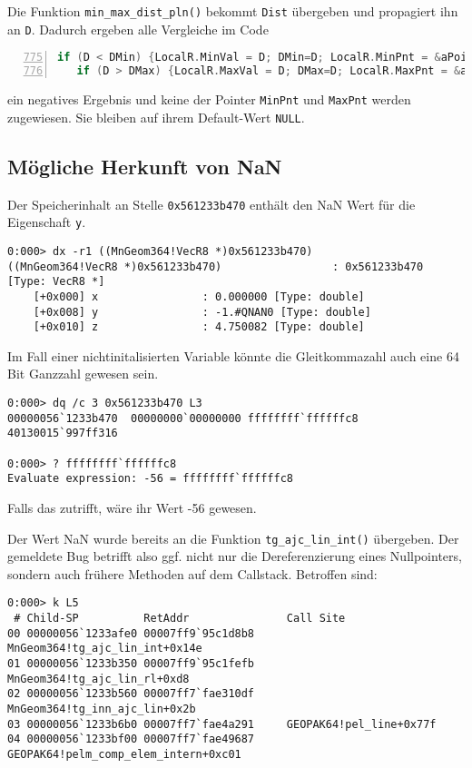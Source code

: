 Die Funktion \verb|min_max_dist_pln()| bekommt \verb|Dist| übergeben und propagiert ihn an \verb|D|. Dadurch ergeben alle Vergleiche im Code

\begin{lstlisting}[language=C, numbers=left, firstnumber=775]
   if (D < DMin) {LocalR.MinVal = D; DMin=D; LocalR.MinPnt = &aPoints[i];}
   if (D > DMax) {LocalR.MaxVal = D; DMax=D; LocalR.MaxPnt = &aPoints[i];} 
\end{lstlisting}

ein negatives Ergebnis und keine der Pointer \verb|MinPnt| und \verb|MaxPnt| werden zugewiesen. Sie bleiben auf ihrem Default-Wert \verb|NULL|.

\subsection{Mögliche Herkunft von NaN}

Der Speicherinhalt an Stelle \verb|0x561233b470| enthält den NaN Wert für die Eigenschaft \verb|y|.

\begin{lstlisting}
0:000> dx -r1 ((MnGeom364!VecR8 *)0x561233b470)
((MnGeom364!VecR8 *)0x561233b470)                 : 0x561233b470 [Type: VecR8 *]
    [+0x000] x                : 0.000000 [Type: double]
    [+0x008] y                : -1.#QNAN0 [Type: double]
    [+0x010] z                : 4.750082 [Type: double]
\end{lstlisting}

Im Fall einer nichtinitalisierten Variable könnte die Gleitkommazahl auch eine 64 Bit Ganzzahl gewesen sein. 

\begin{lstlisting}
0:000> dq /c 3 0x561233b470 L3
00000056`1233b470  00000000`00000000 ffffffff`ffffffc8 40130015`997ff316

0:000> ? ffffffff`ffffffc8
Evaluate expression: -56 = ffffffff`ffffffc8
\end{lstlisting}

Falls das zutrifft, wäre ihr Wert -56 gewesen.

Der Wert NaN wurde bereits an die Funktion \verb|tg_ajc_lin_int()| übergeben. Der gemeldete Bug betrifft also ggf. nicht nur die Dereferenzierung eines Nullpointers, sondern auch frühere Methoden auf dem Callstack. Betroffen sind:

\begin{lstlisting}
0:000> k L5
 # Child-SP          RetAddr               Call Site
00 00000056`1233afe0 00007ff9`95c1d8b8     MnGeom364!tg_ajc_lin_int+0x14e
01 00000056`1233b350 00007ff9`95c1fefb     MnGeom364!tg_ajc_lin_rl+0xd8
02 00000056`1233b560 00007ff7`fae310df     MnGeom364!tg_inn_ajc_lin+0x2b
03 00000056`1233b6b0 00007ff7`fae4a291     GEOPAK64!pel_line+0x77f
04 00000056`1233bf00 00007ff7`fae49687     GEOPAK64!pelm_comp_elem_intern+0xc01
\end{lstlisting}



